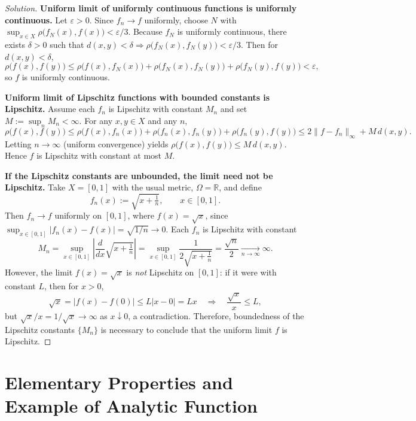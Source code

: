 \documentclass[12pt, a4paper]{report}
\theoremstyle{spaced}
\begin{document}
\begin{proof}[Solution]
	\textbf{Uniform limit of uniformly continuous functions is uniformly continuous.}
	Let $\varepsilon>0$. Since $f_n \to f$ uniformly, choose $N$ with
	$\sup_{x\in X}\rho\!\bigl(f_N(x),f(x)\bigr) < \varepsilon/3$.
	Because $f_N$ is uniformly continuous, there exists $\delta>0$ such that
	$d(x,y)<\delta \Rightarrow \rho\!\bigl(f_N(x),f_N(y)\bigr)<\varepsilon/3$.
	Then for $d(x,y)<\delta$,
	\[
		\rho\!\bigl(f(x),f(y)\bigr)
		\le \rho\!\bigl(f(x),f_N(x)\bigr)+\rho\!\bigl(f_N(x),f_N(y)\bigr)+\rho\!\bigl(f_N(y),f(y)\bigr)
		< \varepsilon,
	\]
	so $f$ is uniformly continuous.

	\medskip
	\textbf{Uniform limit of Lipschitz functions with bounded constants is Lipschitz.}
	Assume each $f_n$ is Lipschitz with constant $M_n$ and set $M:=\sup_n M_n<\infty$.
	For any $x,y\in X$ and any $n$,
	\[
		\rho\!\bigl(f(x),f(y)\bigr)
		\le \rho\!\bigl(f(x),f_n(x)\bigr) + \rho\!\bigl(f_n(x),f_n(y)\bigr) + \rho\!\bigl(f_n(y),f(y)\bigr)
		\le 2\|f-f_n\|_\infty + M\, d(x,y).
	\]
	Letting $n\to\infty$ (uniform convergence) yields $\rho\!\bigl(f(x),f(y)\bigr)\le M\,d(x,y)$.
	Hence $f$ is Lipschitz with constant at most $M$.

	\medskip
	\textbf{If the Lipschitz constants are unbounded, the limit need not be Lipschitz.}
	Take $X=[0,1]$ with the usual metric, $\Omega=\mathbb{R}$, and define
	\[
		f_n(x):=\sqrt{x+\tfrac{1}{n}}, \qquad x\in[0,1].
	\]
	Then $f_n \to f$ uniformly on $[0,1]$, where $f(x)=\sqrt{x}$, since
	$\sup_{x\in[0,1]}|f_n(x)-f(x)| = \sqrt{1/n}\to0$.
	Each $f_n$ is Lipschitz with constant
	\[
		M_n=\sup_{x\in[0,1]} \left|\frac{d}{dx}\sqrt{x+\tfrac{1}{n}}\right|
		= \sup_{x\in[0,1]} \frac{1}{2\sqrt{x+\tfrac{1}{n}}} = \frac{\sqrt{n}}{2}\xrightarrow[n\to\infty]{}\infty.
	\]
	However, the limit $f(x)=\sqrt{x}$ is \emph{not} Lipschitz on $[0,1]$:
	if it were with constant $L$, then for $x>0$,
	\[
		\sqrt{x} = |f(x)-f(0)| \le L |x-0| = Lx \quad\Longrightarrow\quad \frac{\sqrt{x}}{x}\le L,
	\]
	but $\sqrt{x}/x=1/\sqrt{x}\to\infty$ as $x\downarrow0$, a contradiction.
	Therefore, boundedness of the Lipschitz constants $\{M_n\}$ is necessary to conclude
	that the uniform limit $f$ is Lipschitz.
\end{proof}

\newpage

\chapter{Elementary Properties and Example of Analytic Function}
\end{document}
